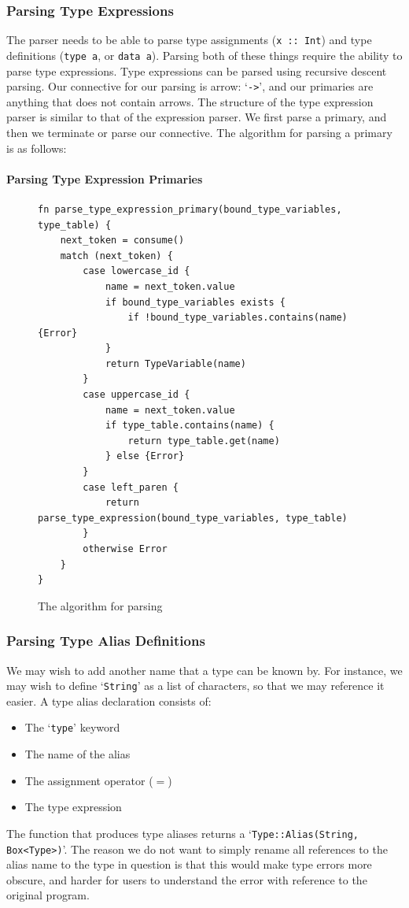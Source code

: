 \subsubsection{Parsing Type Expressions}
The parser needs to be able to parse type assignments (\verb|x :: Int|) and type definitions (\verb|type a|, or \verb|data a|). Parsing both of these things require the ability to parse type expressions. Type expressions can be parsed using recursive descent parsing. Our connective for our parsing is arrow: `\verb|->|', and our primaries are anything that does not contain arrows. The structure of the type expression parser is similar to that of the expression parser. We first parse a primary, and then we terminate or parse our connective. The algorithm for parsing a primary is as follows:

\paragraph{Parsing Type Expression Primaries}
\begin{figure}
\begin{lstlisting}[language=SFL]
fn parse_type_expression_primary(bound_type_variables, type_table) {
    next_token = consume()
    match (next_token) {
        case lowercase_id {
            name = next_token.value
            if bound_type_variables exists {
                if !bound_type_variables.contains(name) {Error}
            }
            return TypeVariable(name)
        }
        case uppercase_id {
            name = next_token.value
            if type_table.contains(name) {
                return type_table.get(name)
            } else {Error}
        }
        case left_paren {
            return parse_type_expression(bound_type_variables, type_table)
        }
        otherwise Error
    }
}
\end{lstlisting}
\caption{The algorithm for parsing }
\end{figure}

\subsubsection{Parsing Type Alias Definitions} 
We may wish to add another name that a type can be known by. For instance, we may wish to define `\verb|String|' as a list of characters, so that we may reference it easier. A type alias declaration consists of:
\begin{itemize}
    \item The `\verb|type|' keyword
    \item The name of the alias
    \item The assignment operator ($=$)
    \item The type expression
\end{itemize}
The function that produces type aliases returns a `\verb|Type::Alias(String, Box<Type>)|'. The reason we do not want to simply rename all references to the alias name to the type in question is that this would make type errors more obscure, and harder for users to understand the error with reference to the original program.

